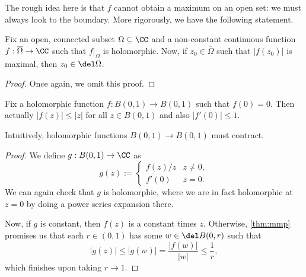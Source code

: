The rough idea here is that $f$ cannot obtain a maximum on an open set: we must always look to the boundary. More rigorously, we have the following statement.
\begin{corollary}
	Fix an open, connected subset $\Omega\subseteq\CC$ and a non-constant continuous function $f:\overline\Omega\to\CC$ such that $f|_\Omega$ is holomorphic. Now, if $z_0\in\overline\Omega$ such that $|f(z_0)|$ is maximal, then $z_0\in\del\Omega$.
\end{corollary}
\begin{proof}
	Once again, we omit this proof.
\end{proof}
\begin{cor}
	Fix a holomorphic function $f:B(0,1)\to B(0,1)$ such that $f(0)=0$. Then actually $|f(z)|\le|z|$ for all $z\in B(0,1)$ and also $|f'(0)|\le1$.
\end{cor}
Intuitively, holomorphic functions $B(0,1)\to B(0,1)$ must contract.
\begin{proof}
	We define $g:B(0,1)\to\CC$ as
	\[g(z):=\begin{cases}
		f(z)/z & z\ne0, \\
		f'(0) & z=0.
	\end{cases}\]
	We can again check that $g$ is holomorphic, where we are in fact holomorphic at $z=0$ by doing a power series expansion there.

	Now, if $g$ is constant, then $f(z)$ is a constant times $z$. Otherwise, \autoref{thm:mmp} promises us that each $r\in(0,1)$ has some $w\in\del B(0,r)$ such that
	\[|g(z)|\le|g(w)|=\frac{|f(w)|}{|w|}\le\frac1r,\]
	which finishes upon taking $r\to 1$.
\end{proof}